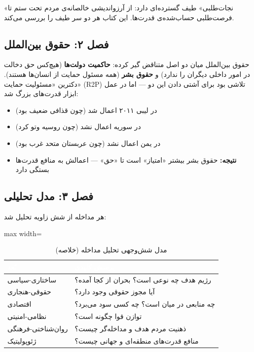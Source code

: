 «نجات‌طلبی» طیف گسترده‌ای دارد: از آرزواندیشی خالصانه‌ی مردم تحت ستم تا فرصت‌طلبی حساب‌شده‌ی قدرت‌ها. این کتاب هر دو سر طیف را بررسی می‌کند.

\subsection{فصل ۲: حقوق بین‌الملل}

حقوق بین‌الملل میان دو اصل متناقض گیر کرده: \textbf{حاکمیت دولت‌ها} (هیچ‌کس حق دخالت در امور داخلی دیگران را ندارد) و \textbf{حقوق بشر} (همه مسئول حمایت از انسان‌ها هستند). دکترین «مسئولیت حمایت» (R2P) تلاشی بود برای آشتی دادن این دو — اما در عمل ابزار قدرت‌های بزرگ شد:
\begin{itemize}
\item در لیبی ۲۰۱۱ اعمال شد (چون قذافی ضعیف بود)
\item در سوریه اعمال نشد (چون روسیه وتو کرد)
\item در یمن اعمال نشد (چون عربستان متحد غرب بود)
\item \textbf{نتیجه:} حقوق بشر بیشتر «امتیاز» است تا «حق» — اعمالش به منافع قدرت‌ها بستگی دارد
\end{itemize}

\subsection{فصل ۳: مدل تحلیلی}

هر مداخله از شش زاویه تحلیل شد:

\begin{table}[htbp]
\centering
\caption{مدل شش‌وجهی تحلیل مداخله (خلاصه)}
\label{tab:app-a-hexagonal}
\begin{adjustbox}{max width=\linewidth}
\begin{tabularx}{\linewidth}{>{\raggedleft\arraybackslash}p{3cm} >{\raggedleft\arraybackslash}X}
\toprule
\rowcolor{PrimaryDeep}
\textcolor{white}{\textbf{بُعد}} & \textcolor{white}{\textbf{پرسش کلیدی}} \\
\midrule
ساختاری-سیاسی & رژیم هدف چه نوعی است؟ بحران از کجا آمده؟ \\
\rowcolor{NeutralLight}
حقوقی-هنجاری & آیا مجوز حقوقی وجود دارد؟ \\
اقتصادی & چه منابعی در میان است؟ چه کسی سود می‌برد؟ \\
\rowcolor{NeutralLight}
نظامی-امنیتی & توازن قوا چگونه است؟ \\
روان‌شناختی-فرهنگی & ذهنیت مردم هدف و مداخله‌گر چیست؟ \\
\rowcolor{NeutralLight}
ژئوپولیتیک & منافع قدرت‌های منطقه‌ای و جهانی چیست؟ \\
\bottomrule
\end{tabularx}
\end{adjustbox}
\end{table}

